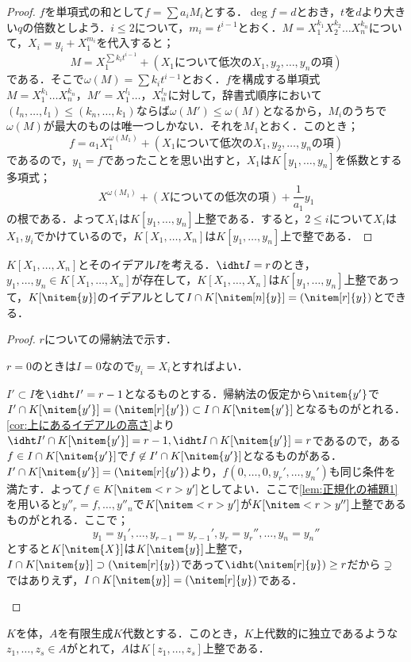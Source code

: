 \begin{proof}
	$f$を単項式の和として$f=\sum a_iM_i$とする．$\deg f=d$とおき，$t$を$d$より大きい$q$の倍数としよう．$i\leq2$について，$m_i=t^{i-1}$とおく．$M=X_1^{k_1}X_2^{k_2}\dots X_n^{k_n}$について，$X_i=y_i+X_1^{m_i}$を代入すると；
	\[M=X_1^{\sum k_it^{i-1}}+(X_1\text{について低次の}X_1,y_2,\dots,y_n\text{の項})\]
	である．そこで$\omega(M)=\sum k_it^{i-1}$とおく．$f$を構成する単項式$M=X_1^{k_1}\dots X_n^{k_n}，M'=X_1^{l_1}\dots，X_n^{l_n}$に対して，辞書式順序において$(l_n,\dots,l_1)\leq (k_n,\dots,k_1)$ならば$\omega(M')\leq\omega(M)$となるから，$M_i$のうちで$\omega(M)$が最大のものは唯一つしかない．それを$M_1$とおく．このとき；
	\[f=a_1X_1^{\omega(M_1)}+(X_1\text{について低次の}X_1,y_2,\dots,y_n\text{の項})\]
	であるので，$y_1=f$であったことを思い出すと，$X_1$は$K[y_1,\dots,y_n]$を係数とする多項式；
	\[X^{\omega(M_1)}+(X\text{についての低次の項})+\frac{1}{a_1}y_1\]
	の根である．よって$X_1$は$K[y_1,\dots,y_n]$上整である．すると，$2\leq i$について$X_i$は$X_1,y_i$でかけているので，$K[X_1,\dots,X_n]$は$K[y_1,\dots,y_n]$上で整である．
\end{proof}

\begin{thm}[多項式環の正規化定理]
	$K[X_1,\dots,X_n]$とそのイデアル$I$を考える．$\idht I=r$のとき，$y_1,\dots,y_n\in K[X_1,\dots,X_n]$が存在して，$K[X_1,\dots,X_n]$は$K[y_1,\dots,y_n]$上整であって，$K[\nitem{y}]$のイデアルとして$I\cap K[\nitem[n]{y}]=(\nitem[r]{y})$とできる．
\end{thm}

\begin{proof}
	$r$についての帰納法で示す．
	
	\begin{step}\item $r=0$のときは$I=0$なので$y_i=X_i$とすればよい．
	
	\item	$I'\subset I$を$\idht I'=r-1$となるものとする．帰納法の仮定から$\nitem{y'}$で$I'\cap K[\nitem{y'}]=(\nitem[r]{y'})\subset I\cap K[\nitem{y'}]$となるものがとれる．\ref{cor:上にあるイデアルの高さ}より$\idht I'\cap K[\nitem{y'}]=r-1,\idht I\cap K[\nitem{y'}]=r$であるので，ある$f\in I\cap K[\nitem{y'}]$で$f\not\in I'\cap K[\nitem{y'}]$となるものがある．$I'\cap K[\nitem{y'}]=(\nitem[r]{y'})$より，$f(0,\dots,0,y_r',\dots,y_n')$も同じ条件を満たす．よって$f\in K[\nitem<r>{y'}]$としてよい．ここで\ref{lem:正規化の補題1}を用いると$y''_r=f,\dots,y''_n$で$K[\nitem<r>{y'}]$が$K[\nitem<r>{y''}]$上整であるものがとれる．ここで；
	\[y_1=y_1',\dots,y_{r-1}=y_{r-1}', y_r=y_r'',\dots,y_n=y_n''\]
	とすると$K[\nitem{X}]$は$K[\nitem{y}]$上整で，$I\cap K[\nitem{y}]\supset (\nitem[r]{y})$であって$\idht(\nitem[r]{y})\geq r$だから$\supsetneq$ではありえず，$I\cap K[\nitem{y}]=(\nitem[r]{y})$である．
	\end{step}
\end{proof}
\begin{thm}[Noetherの正規化定理]\label{thm:正規化定理}
	$K$を体，$A$を有限生成$K$代数とする．このとき，$K$上代数的に独立であるような$z_1,\dots,z_s\in A$がとれて，$A$は$K[z_1,\dots,z_s]$上整である．
\end{thm}

